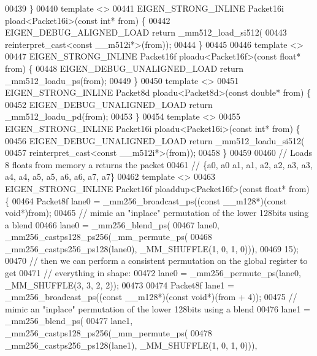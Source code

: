 \begin{DoxyCode}
00439 \}
00440 \textcolor{keyword}{template} <>
00441 EIGEN\_STRONG\_INLINE Packet16i pload<Packet16i>(\textcolor{keyword}{const} \textcolor{keywordtype}{int}* from) \{
00442   EIGEN\_DEBUG\_ALIGNED\_LOAD \textcolor{keywordflow}{return} \_mm512\_load\_si512(
00443       reinterpret\_cast<const \_\_m512i*>(from));
00444 \}
00445 
00446 \textcolor{keyword}{template} <>
00447 EIGEN\_STRONG\_INLINE Packet16f ploadu<Packet16f>(\textcolor{keyword}{const} \textcolor{keywordtype}{float}* from) \{
00448   EIGEN\_DEBUG\_UNALIGNED\_LOAD \textcolor{keywordflow}{return} \_mm512\_loadu\_ps(from);
00449 \}
00450 \textcolor{keyword}{template} <>
00451 EIGEN\_STRONG\_INLINE Packet8d ploadu<Packet8d>(\textcolor{keyword}{const} \textcolor{keywordtype}{double}* from) \{
00452   EIGEN\_DEBUG\_UNALIGNED\_LOAD \textcolor{keywordflow}{return} \_mm512\_loadu\_pd(from);
00453 \}
00454 \textcolor{keyword}{template} <>
00455 EIGEN\_STRONG\_INLINE Packet16i ploadu<Packet16i>(\textcolor{keyword}{const} \textcolor{keywordtype}{int}* from) \{
00456   EIGEN\_DEBUG\_UNALIGNED\_LOAD \textcolor{keywordflow}{return} \_mm512\_loadu\_si512(
00457       reinterpret\_cast<const \_\_m512i*>(from));
00458 \}
00459 
00460 \textcolor{comment}{// Loads 8 floats from memory a returns the packet}
00461 \textcolor{comment}{// \{a0, a0  a1, a1, a2, a2, a3, a3, a4, a4, a5, a5, a6, a6, a7, a7\}}
00462 \textcolor{keyword}{template} <>
00463 EIGEN\_STRONG\_INLINE Packet16f ploaddup<Packet16f>(\textcolor{keyword}{const} \textcolor{keywordtype}{float}* from) \{
00464   Packet8f lane0 = \_mm256\_broadcast\_ps((\textcolor{keyword}{const} \_\_m128*)(\textcolor{keyword}{const} \textcolor{keywordtype}{void}*)from);
00465   \textcolor{comment}{// mimic an "inplace" permutation of the lower 128bits using a blend}
00466   lane0 = \_mm256\_blend\_ps(
00467       lane0, \_mm256\_castps128\_ps256(\_mm\_permute\_ps(
00468                  \_mm256\_castps256\_ps128(lane0), \_MM\_SHUFFLE(1, 0, 1, 0))),
00469       15);
00470   \textcolor{comment}{// then we can perform a consistent permutation on the global register to get}
00471   \textcolor{comment}{// everything in shape:}
00472   lane0 = \_mm256\_permute\_ps(lane0, \_MM\_SHUFFLE(3, 3, 2, 2));
00473 
00474   Packet8f lane1 = \_mm256\_broadcast\_ps((\textcolor{keyword}{const} \_\_m128*)(\textcolor{keyword}{const} \textcolor{keywordtype}{void}*)(from + 4));
00475   \textcolor{comment}{// mimic an "inplace" permutation of the lower 128bits using a blend}
00476   lane1 = \_mm256\_blend\_ps(
00477       lane1, \_mm256\_castps128\_ps256(\_mm\_permute\_ps(
00478                  \_mm256\_castps256\_ps128(lane1), \_MM\_SHUFFLE(1, 0, 1, 0))),

\end{DoxyCode}
